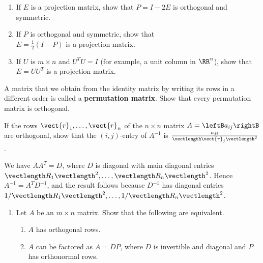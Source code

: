 \begin{multicols}{2}
\begin{ex}
\begin{enumerate}[label={\alph*.}]
\item If $E$ is a projection matrix, show that $P = I - 2E$ is orthogonal and symmetric.

\item If $P$ is orthogonal and symmetric, show that \\ $E = \frac{1}{2}(I - P)$ is a projection matrix.

\item If $U$ is $m \times n$ and $U^{T}U = I$ (for example, a unit column in $\RR^n$), show that $E = UU^{T}$ is a projection matrix.

\end{enumerate}
\end{ex}

\begin{ex}
A matrix that we obtain from the identity matrix by writing its rows in a different order is called a \textbf{permutation matrix}. Show that every permutation matrix is orthogonal.
\end{ex}

\begin{ex}
If the rows $\vect{r}_{1}, \dots, \vect{r}_{n}$ of the $n \times n$ matrix $A = \leftB a_{ij} \rightB$ are orthogonal, show that the $(i, j)$-entry of $A^{-1}$ is $\frac{a_{ji}}{\vectlength \vect{r}_{j} \vectlength^2}$.

\begin{sol}
We have $AA^{T} = D$, where $D$ is diagonal with main diagonal entries $\vectlength R_{1}\vectlength^{2}, \dots, \vectlength R_{n}\vectlength^{2}$. Hence $A^{-1} = A^{T}D^{-1}$, and the result follows because $D^{-1}$ has diagonal entries $1 / \vectlength R_{1}\vectlength^{2}, \dots, 1 / \vectlength R_{n}\vectlength^{2}$.
\end{sol}
\end{ex}

\begin{ex}
\begin{enumerate}[label={\alph*.}]
\item Let $A$ be an $m \times n$ matrix. Show that the following are equivalent.


\begin{enumerate}[label={\roman*.}]
\item $A$ has orthogonal rows.

\item $A$ can be factored as $A = DP$, where $D$ is invertible and diagonal and $P$ has orthonormal rows.


\end{enumerate}
\end{enumerate}
\end{ex}
\end{multicols}
